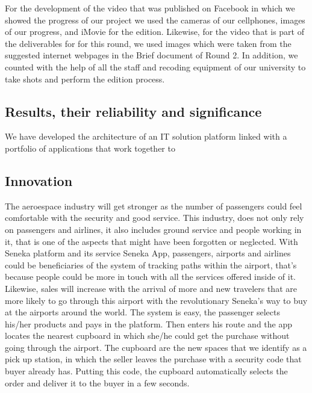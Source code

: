 \documentclass[12pt]{article}
\begin{document}
For the development of the video that was published on Facebook in which we showed the progress of our project we used the cameras of our cellphones, images of our progress, and iMovie for the edition. Likewise, for the video that is part of the deliverables for for this round, we used images which were taken from the suggested internet webpages in the Brief document of Round 2. In addition, we counted with the help of all the staff and recoding equipment of our university to take shots and perform the edition process.\\ 


\subsection{Results, their reliability and significance}

We have developed the architecture of an IT solution platform linked with a portfolio of applications that work together to 

\subsection{Innovation}

The aeroespace industry will get stronger as the number of passengers could feel comfortable with the security and good service. This industry, does not only rely on passengers and airlines, it also includes ground service and people working in it, that is one of the aspects that might have been forgotten or neglected. With Seneka platform and its service Seneka App, passengers, airports and airlines could be beneficiaries of the system of tracking paths within the airport, that's because people could be more in touch with all the services offered inside of it.\\

Likewise, sales will increase with the arrival of more and new travelers that are more likely to go through this airport with the revolutionary Seneka's way to buy at the airports around the world. The system is easy, the passenger selects his/her products and pays in the platform. Then enters his route and the app locates the nearest cupboard in which she/he could get the purchase without going through the airport. The cupboard are the new spaces that we identify as a pick up station, in which the seller leaves the purchase with a security code that buyer already has. Putting this code, the cupboard automatically selects the order and deliver it to the buyer in a few seconds.\\
\end{document}
